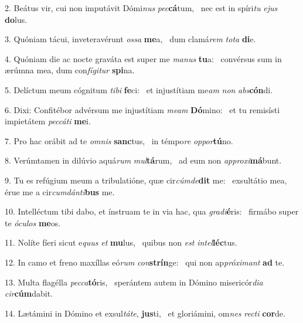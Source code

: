 2. Beátus vir, cui non imputávit Dómi\textit{nus} \textit{pec}\textbf{cá}tum, \ast\  nec est in spíri\textit{tu} \textit{e}\textit{jus} \textbf{do}lus.\

3. Quóniam tácui, inveteravérunt \textit{os}\textit{sa} \textbf{me}a, \ast\  dum clamá\textit{rem} \textit{to}\textit{ta} \textbf{di}e.\

4. Quóniam die ac nocte graváta est super me \textit{ma}\textit{nus} \textbf{tu}a: \ast\  convérsus sum in ærúmna mea, dum con\textit{fí}\textit{gi}\textit{tur} \textbf{spi}na.\

5. Delíctum meum cógnitum \textit{ti}\textit{bi} \textbf{fe}ci: \ast\  et injustítiam me\textit{am} \textit{non} \textit{abs}\textbf{cón}di.\

6. Dixi: Confitébor advérsum me injustítiam \textit{me}\textit{am} \textbf{Dó}mino: \ast\  et tu remisísti impietátem \textit{pec}\textit{cá}\textit{ti} \textbf{me}i.\

7. Pro hac orábit ad te \textit{om}\textit{nis} \textbf{sanc}tus, \ast\  in témpo\textit{re} \textit{op}\textit{por}\textbf{tú}no.\

8. Verúmtamen in dilúvio aquá\textit{rum} \textit{mul}\textbf{tá}rum, \ast\  ad eum non \textit{ap}\textit{pro}\textit{xi}\textbf{má}bunt.\

9. Tu es refúgium meum a tribulatióne, quæ cir\textit{cúm}\textit{de}\textbf{dit} me: \ast\  exsultátio mea, érue me a cir\textit{cum}\textit{dán}\textit{ti}\textbf{bus} me.\

10. Intelléctum tibi dabo, et ínstruam te in via hac, qua \textit{gra}\textit{di}\textbf{é}ris: \ast\  firmábo super te \textit{ó}\textit{cu}\textit{los} \textbf{me}os.\

11. Nolíte fíeri sicut e\textit{quus} \textit{et} \textbf{mu}lus, \ast\  quibus non \textit{est} \textit{in}\textit{tel}\textbf{léc}tus.\

12. In camo et freno maxíllas eó\textit{rum} \textit{con}\textbf{strín}ge: \ast\  qui non ap\textit{pró}\textit{xi}\textit{mant} \textbf{ad} te.\

13. Multa flagélla \textit{pec}\textit{ca}\textbf{tó}ris, \ast\  sperántem autem in Dómino misericór\textit{di}\textit{a} \textit{cir}\textbf{cúm}dabit.\

14. Lætámini in Dómino et exsul\textit{tá}\textit{te}, \textbf{jus}ti, \ast\  et gloriámini, om\textit{nes} \textit{rec}\textit{ti} \textbf{cor}de.\

